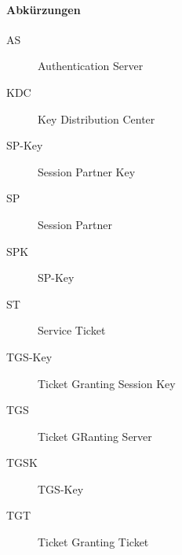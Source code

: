 			\paragraph{Abkürzungen}
				\begin{description}
					\item[AS] Authentication Server
					\item[KDC] Key Distribution Center
					\item[SP-Key] Session Partner Key
					\item[SP] Session Partner
					\item[SPK] SP-Key
					\item[ST] Service Ticket
					\item[TGS-Key] Ticket Granting Session Key
					\item[TGS] Ticket GRanting Server
					\item[TGSK] TGS-Key
					\item[TGT] Ticket Granting Ticket
				\end{description}

